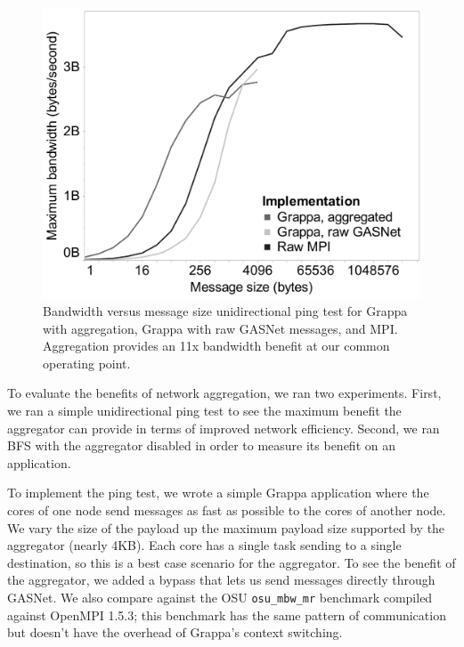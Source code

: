 \begin{figure}[htb]
\begin{center}
  \includegraphics[width=0.95\columnwidth]{figs/aggregator_ping}
\begin{minipage}{0.95\columnwidth}
  \caption{\label{fig:aggregator-ping} Bandwidth versus message size
    unidirectional ping test for Grappa with aggregation, Grappa with
    raw GASNet messages, and MPI. Aggregation provides an 11x
    bandwidth benefit at our common operating point.}
\end{minipage}
\vspace{-3ex}
\end{center}
\end{figure}

To evaluate the benefits of network aggregation, we ran two experiments.
First, we ran a simple unidirectional ping test to see the maximum
benefit the aggregator can provide in terms of improved network
efficiency. Second, we ran BFS with the aggregator disabled in order to
measure its benefit on an application.

To implement the ping test, we wrote a simple Grappa application where
the cores of one node send messages as fast as possible to the cores
of another node. We vary the size of the payload up the maximum
payload size supported by the aggregator (nearly 4KB). Each core has a
single task sending to a single destination, so this is a best case
scenario for the aggregator. To see the benefit of the aggregator, we
added a bypass that lets us send messages directly through GASNet. We
also compare against the OSU \texttt{osu\_mbw\_mr} benchmark
\cite{osu:mpi}  compiled against OpenMPI 1.5.3; this
benchmark has the same pattern of communication but doesn't have the
overhead of Grappa's context switching.

